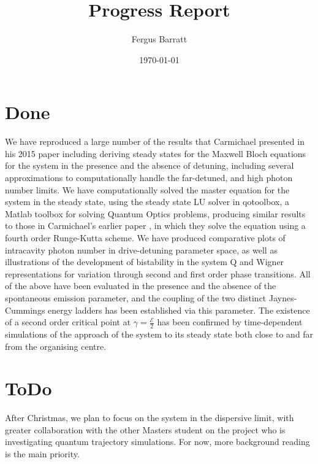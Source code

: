 \documentclass[reqno]{amsart}
\title{Progress Report}
\author{Fergus Barratt}
\date{\today}
\newcommand{\Epsilon}{\mathcal{E}}
\begin{document}
  \maketitle
  \section{Done}
  We have reproduced a large number of the results that Carmichael presented in his 2015 paper \autocite{Carmichael2015} including deriving steady states for the Maxwell Bloch equations for the system in the presence and the absence of detuning, including several approximations to computationally handle the far-detuned, and high photon number limits. We have computationally solved the master equation for the system in the steady state, using the steady state LU solver in qotoolbox, a Matlab toolbox for solving Quantum Optics problems, producing similar results to those in Carmichael's earlier paper \autocite{Alsing1999}, in which they solve the equation using a fourth order Runge-Kutta scheme. We have produced comparative plots of intracavity photon number in drive-detuning parameter space, as well as illustrations of the development of bistability in the system Q and Wigner representations for variation through second and first order phase transitions. All of the above have been evaluated in the presence and the absence of the spontaneous emission parameter, and the coupling of the two distinct Jaynes-Cummings energy ladders has been established via this parameter. The existence of a second order critical point at $\gamma = \frac{\Epsilon}{2}$ has been confirmed by time-dependent simulations of the approach of the system to its steady state both close to and far from the organising centre.
  \section{ToDo}
  After Christmas, we plan to focus on the system in the dispersive limit, with greater collaboration with the other Masters student on the project who is investigating quantum trajectory simulations. For now, more background reading is the main priority.
  \printbibliography\
\end{document}
